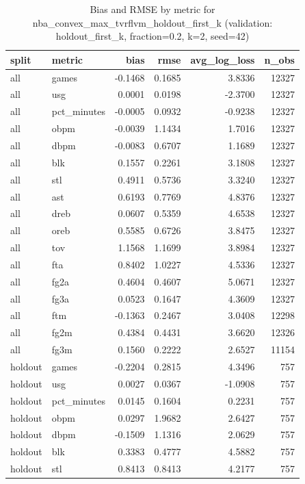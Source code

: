 \begin{table}
\caption{Bias and RMSE by metric for nba_convex_max_tvrflvm_holdout_first_k (validation: holdout_first_k, fraction=0.2, k=2, seed=42)}
\label{tab:nba_convex_max_tvrflvm_holdout_first_k_vs_holdout_first_k_f20_k2_s42_bias_rmse}
\begin{tabular}{llrrrr}
\toprule
split & metric & bias & rmse & avg\_log\_loss & n\_obs \\
\midrule
all & games & -0.1468 & 0.1685 & 3.8336 & 12327 \\
all & usg & 0.0001 & 0.0198 & -2.3700 & 12327 \\
all & pct\_minutes & -0.0005 & 0.0932 & -0.9238 & 12327 \\
all & obpm & -0.0039 & 1.1434 & 1.7016 & 12327 \\
all & dbpm & -0.0083 & 0.6707 & 1.1689 & 12327 \\
all & blk & 0.1557 & 0.2261 & 3.1808 & 12327 \\
all & stl & 0.4911 & 0.5736 & 3.3240 & 12327 \\
all & ast & 0.6193 & 0.7769 & 4.8376 & 12327 \\
all & dreb & 0.0607 & 0.5359 & 4.6538 & 12327 \\
all & oreb & 0.5585 & 0.6726 & 3.8475 & 12327 \\
all & tov & 1.1568 & 1.1699 & 3.8984 & 12327 \\
all & fta & 0.8402 & 1.0227 & 4.5336 & 12327 \\
all & fg2a & 0.4604 & 0.4607 & 5.0671 & 12327 \\
all & fg3a & 0.0523 & 0.1647 & 4.3609 & 12327 \\
all & ftm & -0.1363 & 0.2467 & 3.0408 & 12298 \\
all & fg2m & 0.4384 & 0.4431 & 3.6620 & 12326 \\
all & fg3m & 0.1560 & 0.2222 & 2.6527 & 11154 \\
holdout & games & -0.2204 & 0.2815 & 4.3496 & 757 \\
holdout & usg & 0.0027 & 0.0367 & -1.0908 & 757 \\
holdout & pct\_minutes & 0.0145 & 0.1604 & 0.2231 & 757 \\
holdout & obpm & 0.0297 & 1.9682 & 2.6427 & 757 \\
holdout & dbpm & -0.1509 & 1.1316 & 2.0629 & 757 \\
holdout & blk & 0.3383 & 0.4777 & 4.5882 & 757 \\
holdout & stl & 0.8413 & 0.8413 & 4.2177 & 757 \\

\end{tabular}
\end{table}
